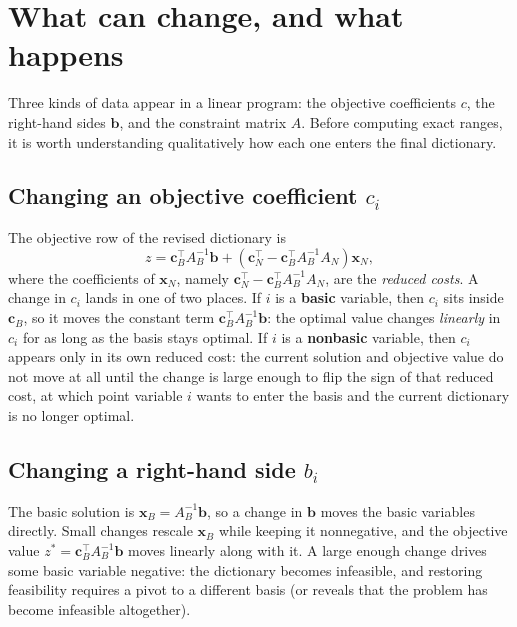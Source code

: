 \section{What can change, and what happens}
\label{sec:sensitivity-overview}

Three kinds of data appear in a linear program: the objective coefficients \(c\), the right-hand sides \(\mathbf{b}\), and the constraint matrix \(A\). Before computing exact ranges, it is worth understanding qualitatively how each one enters the final dictionary.

\subsection{Changing an objective coefficient \( c_i \)}

The objective row of the revised dictionary is
\[
z = \mathbf{c}_B^\top A_B^{-1} \mathbf{b} + (\mathbf{c}_N^\top - \mathbf{c}_B^\top A_B^{-1} A_N) \mathbf{x}_N,
\]
where the coefficients of \( \mathbf{x}_N \), namely \( \mathbf{c}_N^\top - \mathbf{c}_B^\top A_B^{-1} A_N \), are the \emph{reduced costs}. A change in \(c_i\) lands in one of two places. If \(i\) is a \textbf{basic} variable, then \(c_i\) sits inside \(\mathbf{c}_B\), so it moves the constant term \(\mathbf{c}_B^\top A_B^{-1}\mathbf{b}\): the optimal value changes \emph{linearly} in \(c_i\) for as long as the basis stays optimal. If \(i\) is a \textbf{nonbasic} variable, then \(c_i\) appears only in its own reduced cost: the current solution and objective value do not move at all until the change is large enough to flip the sign of that reduced cost, at which point variable \(i\) wants to enter the basis and the current dictionary is no longer optimal.

\subsection{Changing a right-hand side \( b_i \)}

The basic solution is \( \mathbf{x}_B = A_B^{-1}\mathbf{b} \), so a change in \(\mathbf{b}\) moves the basic variables directly. Small changes rescale \(\mathbf{x}_B\) while keeping it nonnegative, and the objective value \( z^* = \mathbf{c}_B^\top A_B^{-1}\mathbf{b} \) moves linearly along with it. A large enough change drives some basic variable negative: the dictionary becomes infeasible, and restoring feasibility requires a pivot to a different basis (or reveals that the problem has become infeasible altogether).

